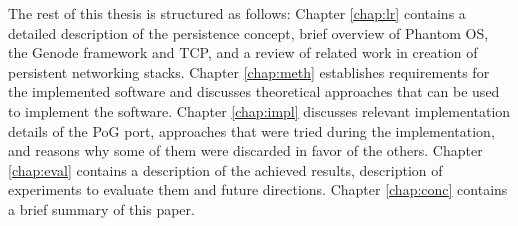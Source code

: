 The rest of this thesis is structured as follows: Chapter \ref{chap:lr}
contains a detailed description of the persistence concept, brief overview of
Phantom OS, the Genode framework and TCP, and a review of related work in
creation of persistent networking stacks. Chapter \ref{chap:meth} establishes
requirements for the implemented software and discusses theoretical approaches
that can be used to implement the software. Chapter \ref{chap:impl} discusses
relevant implementation details of the PoG port, approaches that were tried
during the implementation, and reasons why some of them were discarded in favor
of the others. Chapter \ref{chap:eval} contains a description of the achieved
results, description of experiments to evaluate them and future directions.
Chapter \ref{chap:conc} contains a brief summary of this paper.

